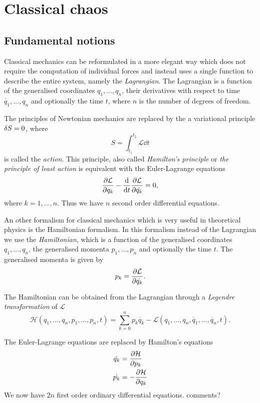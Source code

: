 \documentclass[../thesis.tex]{subfiles}
\theoremstyle{plain}
\begin{document}
\chapter{Classical chaos}

\section{Fundamental notions}

Classical mechanics can be reformulated in a more elegant way which does not
require the computation of individual forces and instead uses a single function to
describe the entire system, namely the \emph{Lagrangian}.
The Lagrangian is a function of the generalised coordinates \(q_1, \dotsc, q_n\),
their derivatives with respect to time \(\dot{q_1}, \dotsc, \dot{q_n}\)
and optionally the time \(t\), where \(n\) is the number of degrees of freedom.

The principles of Newtonian mechanics are replaced by the a variational principle
\(\var{S} = 0\), where
\begin{equation}
  \label{eq:action}
  S = \int_{t_1}^{t_2} \mathcal{L} \dd{t}
\end{equation}
is called the \emph{action}.
This principle, also called \emph{Hamilton's principle} or \emph{the principle of least action}
is equivalent with the Euler-Lagrange equations
\[
  \pdv{\mathcal{L}}{q_k} - \dv{t}\pdv{\mathcal{L}}{\dot{q_k}} = 0,
\]
where \(k=1,\dotsc, n\).
Thus we have \(n\) second order differential equations.

An other formalism for classical mechanics which is very useful in theoretical physics is
the Hamiltonian formalism. In this formalism instead of the \mbox{Lagrangian} we use the
\emph{Hamiltonian}, which is a function of the generalised coordinates \(q_1, \dotsc, q_n\),
the generalised momenta \(p_1, \dotsc, p_n\) and optionally the time \(t\).
The generalised momenta is given by
\[
  p_k = \pdv{\mathcal{L}}{\dot{q_k}}.
\]

The Hamiltonian can be obtained from the Lagrangian through a \emph{Legendre transformation} of
\(\mathcal{L}\)
\begin{equation}
  \label{eq:legendre-tr}
  \mathcal{H}(q_1, \dotsc, q_n, p_1, \dotsc, p_n, t)
  = \sum_{k=0}^n p_k\dot{q_k} - \mathcal{L}(q_1, \dotsc, q_n, \dot{q_1}, \dotsc, \dot{q_n}, t).
\end{equation}

The Euler-Lagrange equations are replaced by Hamilton's equations
\begin{align*}
  \dot{q_k} &= \pdv{\mathcal{H}}{p_k} \\
  \dot{p_k} &= -\pdv{\mathcal{H}}{q_k}
\end{align*}
We now have \(2n\) first order ordinary differential equations. {\color{red}comments?}
\end{document}

